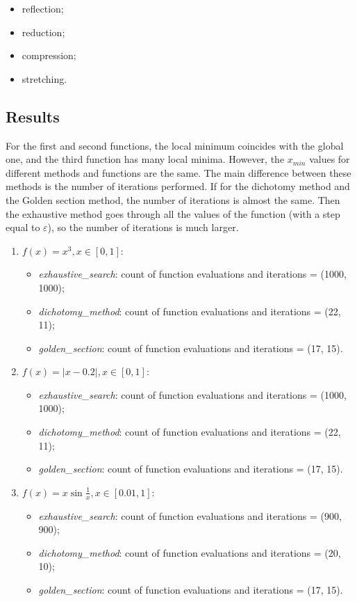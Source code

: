 \begin{itemize}
    \item reflection;
    \item reduction;
    \item compression;
    \item stretching.
\end{itemize}

\subsection{Results}

For the first and second functions, the local minimum coincides with the global one, and the third function has many local minima.
However, the $x_{min}$ values for different methods and functions are the same.
The main difference between these methods is the number of iterations performed.
If for the dichotomy method and the Golden section method, the number of iterations is almost the same.
Then the exhaustive method goes through all the values of the function (with a step equal to $\varepsilon$), so the number of iterations is much larger.

\begin{enumerate}
    \item{
        $f(x) = x^3, x \in [0, 1]$:
        \begin{itemize}
            \item{\textit{exhaustive\_search}: count of function evaluations and iterations = (1000, 1000);}
            \item{\textit{dichotomy\_method}: count of function evaluations and iterations = (22, 11);}
            \item{\textit{golden\_section}: count of function evaluations and iterations = (17, 15).}
        \end{itemize}
    }
    \item{
        $f(x) = \lvert x - 0.2 \rvert, x \in [0, 1]$:
        \begin{itemize}
            \item{\textit{exhaustive\_search}: count of function evaluations and iterations = (1000, 1000);}
            \item{\textit{dichotomy\_method}: count of function evaluations and iterations = (22, 11);}
            \item{\textit{golden\_section}: count of function evaluations and iterations = (17, 15).}
        \end{itemize}
    }
    \item{
        $f(x) = x\sin{\frac{1}{x}}, x \in [0.01, 1]$:
        \begin{itemize}
            \item{\textit{exhaustive\_search}: count of function evaluations and iterations = (900, 900);}
            \item{\textit{dichotomy\_method}: count of function evaluations and iterations = (20, 10);}
            \item{\textit{golden\_section}: count of function evaluations and iterations = (17, 15).}
        \end{itemize}
    }
\end{enumerate}

